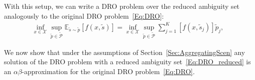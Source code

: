 \documentclass{article}
\newcommand{\mX}{\mathcal{X}}
\newcommand{\mP}{\mathcal{P}}
\newcommand{\mS}{\mathcal{S}}
\newcommand{\E}{\mathbb{E}}
\newcommand{\newscen}[1]{\tilde{s}_{#1}}%
\begin{document}
With this setup, we can write a DRO problem over the reduced ambiguity
set analogously to the original DRO problem~\eqref{Eq:DRO}: %
\begin{align}
	\inf_{x\in\mX} \sup_{\tilde{p} \in \tilde{\mP}}  \E_{\tilde{s}\sim \tilde{p}} \left[f(x,\tilde{s})\right]
	=
	\inf_{x\in\mX} \sup_{\tilde{p} \in \tilde{\mP}}  \sum_{j=1}^{K} \left[f(x,\newscen{j})\right]\tilde{p}_j,  \tag{DROred}\label{Eq:DRO_reduced}	
\end{align}

We now show that under the assumptions of Section~\ref{Sec:AggregatingScen} any solution of the DRO problem with a reduced ambiguity set~\eqref{Eq:DRO_reduced} is an \(\alpha \beta\)-approximation for the original DRO problem~\eqref{Eq:DRO}. 
\end{document}
